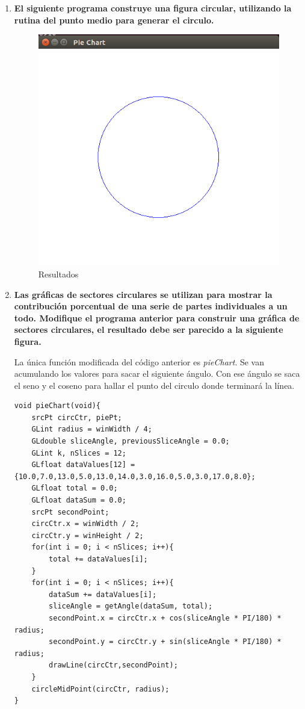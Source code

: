 \documentclass[a4paper,12pt]{article}
\begin{document}
\begin{enumerate}
\item \textbf{El siguiente programa construye una figura circular, utilizando la rutina del punto medio para generar el circulo.}

\begin{figure}[H]
 \centering
 \includegraphics[scale = 0.5]{4.png}
 \caption{Resultados}
\end{figure}

\item \textbf{Las gráficas de sectores circulares se utilizan para mostrar la contribución porcentual de una serie de partes individuales a un todo.
Modifique el programa anterior para construir una gráfica de sectores circulares, el resultado debe ser parecido a la siguiente figura.}

La única función modificada del código anterior es \textit{pieChart}. Se van acumulando los valores para sacar
el siguiente ángulo. Con ese ángulo se saca el seno y el coseno para hallar el punto del circulo donde terminará
la línea.

\begin{lstlisting}
void pieChart(void){
    srcPt circCtr, piePt;
    GLint radius = winWidth / 4;
    GLdouble sliceAngle, previousSliceAngle = 0.0;
    GLint k, nSlices = 12;
    GLfloat dataValues[12] = {10.0,7.0,13.0,5.0,13.0,14.0,3.0,16.0,5.0,3.0,17.0,8.0};
    GLfloat total = 0.0;
    GLfloat dataSum = 0.0;
    srcPt secondPoint;
    circCtr.x = winWidth / 2;
    circCtr.y = winHeight / 2;
    for(int i = 0; i < nSlices; i++){
        total += dataValues[i];
    }
    for(int i = 0; i < nSlices; i++){
        dataSum += dataValues[i];
        sliceAngle = getAngle(dataSum, total);
        secondPoint.x = circCtr.x + cos(sliceAngle * PI/180) * radius;
        secondPoint.y = circCtr.y + sin(sliceAngle * PI/180) * radius;
        drawLine(circCtr,secondPoint);
    }
    circleMidPoint(circCtr, radius);
}
\end{lstlisting}


\end{enumerate}
\end{document}
